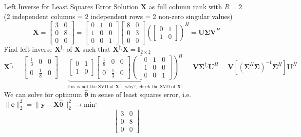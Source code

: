 \documentclass[mathserif, aspectratio=1610]{intbeamer}
\begin{document}
\begin{frame}[t]{Left Inverse for Least Squares Error Solution}
$\bm{X}$ as full column rank with $R=2$ (2 independent columns = 2 independent rows = 2 non-zero singular values)
$$
\bm{X} =
\begin{bmatrix}
3 & 0 \\ 0 & 8 \\ 0 & 0
\end{bmatrix}
=
\begin{bmatrix}
0 & 1 & 0 \\
1 & 0 & 0 \\
0 & 0 & 1
\end{bmatrix}
%
\begin{bmatrix}
8 & 0\\
0 & 3\\
0 & 0
\end{bmatrix}
%
\left(
\begin{bmatrix}
0 & 1\\
1 & 0
\end{bmatrix}
\right)^H=
\bm{U} \bm{\Sigma} \bm{V}^H
$$
Find left-inverse $\bm{X}^{\dagger_l}$ of $\bm{X}$ such that $\bm{X}^{\dagger_l} \bm{X} = \bm{I}_{2 \times 2}$
%
$$
\bm{X}^{\dagger_l} =
\begin{bmatrix}
\frac{1}{3} & 0 & 0\\ 0 & \frac{1}{8} & 0
\end{bmatrix}
=
\underbrace{
\begin{bmatrix}
0 & 1\\
1 & 0
\end{bmatrix}
%
\begin{bmatrix}
\frac{1}{8} & 0 & 0\\
0 & \frac{1}{3} & 0
\end{bmatrix}
%
\left(
\begin{bmatrix}
0 & 1 & 0 \\
1 & 0 & 0 \\
0 & 0 & 1
\end{bmatrix}
\right)^H}_{\text{this is not the SVD of } \bm{X}^{\dagger_l} \text{, why?, check the SVD of } \bm{X}^{\dagger_l}}
=
\bm{V} \bm{\Sigma}^{\dagger_l} \bm{U}^H =
\bm{V} \left[(\bm{\Sigma}^H \bm{\Sigma})^{-1} \bm{\Sigma}^H\right] \bm{U}^H
$$
%
We can solve for optimum $\hat{\bm{\theta}}$ in sense of least squares error, i.e. $\lVert \bm{e} \rVert_2^2 = \lVert \bm{y} - \bm{X} \hat{\bm{\theta}} \rVert_2^2\rightarrow \text{min}$:
$$
\begin{bmatrix}
3 & 0 \\ 0 & 8 \\ 0 & 0

\end{bmatrix}$$
\end{frame}
\end{document}
